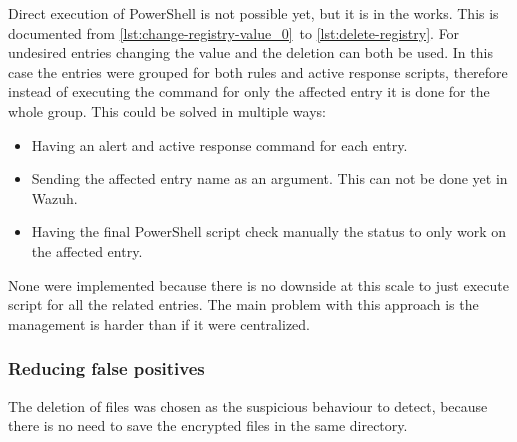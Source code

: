Direct execution of PowerShell is not possible yet, but it is in the works.
This is documented from \ref{lst:change-registry-value_0}\ to \ref{lst:delete-registry}.
For undesired entries changing the value and the deletion can both be used.
\linej
\linej
In this case the entries were grouped for both rules and active response scripts, therefore instead of executing the command for only the affected entry it is done for the whole group.
This could be solved in multiple ways:
\begin{itemize}
	\item Having an alert and active response command for each entry.
	\item Sending the affected entry name as an argument. This can not be done yet in Wazuh.
	\item Having the final PowerShell script check manually the status to only work on the affected entry.
\end{itemize}
\linej
None were implemented because there is no downside at this scale to just execute script for all the related entries.
The main problem with this approach is the management is harder than if it were centralized.

\subsubsection{Reducing false positives}
The deletion of files was chosen as the suspicious behaviour to detect, because there is no need to save the encrypted files in the same directory.


